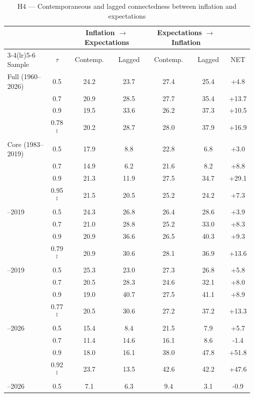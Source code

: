 \begin{table}[!ht]
\centering
\caption{H4 --- Contemporaneous and lagged connectedness between inflation and expectations}
\label{tab:h6}
\setlength{\tabcolsep}{6pt}\footnotesize
\begin{threeparttable}
\begin{tabular}{l c c c c c c}
\toprule
 & & \multicolumn{2}{c}{Inflation $\to$ Expectations} & \multicolumn{2}{c}{Expectations $\to$ Inflation} & \\
\cmidrule(lr){3-4}\cmidrule(lr){5-6}
Sample & $\tau$ & Contemp. & Lagged & Contemp. & Lagged & NET \\
\midrule
Full (1960--2026) & 0.5 & 24.2 & 23.7 & 27.4 & 25.4 & +4.8 \\
 & 0.7 & 20.9 & 28.5 & 27.7 & 35.4 & +13.7 \\
 & 0.9 & 19.5 & 33.6 & 26.2 & 37.3 & +10.5 \\
 & 0.78$^{\ddagger}$ & 20.2 & 28.7 & 28.0 & 37.9 & +16.9 \\
\addlinespace
Core (1983--2019) & 0.5 & 17.9 & 8.8 & 22.8 & 6.8 & +3.0 \\
 & 0.7 & 14.9 & 6.2 & 21.6 & 8.2 & +8.8 \\
 & 0.9 & 21.3 & 11.9 & 27.5 & 34.7 & +29.1 \\
 & 0.95$^{\ddagger}$ & 21.5 & 20.5 & 25.2 & 24.2 & +7.3 \\
\addlinespace
1960--2019 & 0.5 & 24.3 & 26.8 & 26.4 & 28.6 & +3.9 \\
 & 0.7 & 21.0 & 28.8 & 25.2 & 33.0 & +8.3 \\
 & 0.9 & 20.9 & 36.6 & 26.5 & 40.3 & +9.3 \\
 & 0.79$^{\ddagger}$ & 20.9 & 30.6 & 28.1 & 36.9 & +13.6 \\
\addlinespace
1970--2019 & 0.5 & 25.3 & 23.0 & 27.3 & 26.8 & +5.8 \\
 & 0.7 & 20.5 & 28.3 & 24.6 & 32.1 & +8.0 \\
 & 0.9 & 19.0 & 40.7 & 27.5 & 41.1 & +8.9 \\
 & 0.77$^{\ddagger}$ & 20.5 & 30.6 & 27.2 & 37.2 & +13.3 \\
\addlinespace
1983--2026 & 0.5 & 15.4 & 8.4 & 21.5 & 7.9 & +5.7 \\
 & 0.7 & 11.4 & 14.6 & 16.1 & 8.6 & -1.4 \\
 & 0.9 & 18.0 & 16.1 & 38.0 & 47.8 & +51.8 \\
 & 0.92$^{\ddagger}$ & 23.7 & 13.5 & 42.6 & 42.2 & +47.6 \\
\addlinespace
1993--2026 & 0.5 & 7.1 & 6.3 & 9.4 & 3.1 & -0.9 \\

\end{tabular}
\end{threeparttable}
\end{table}
